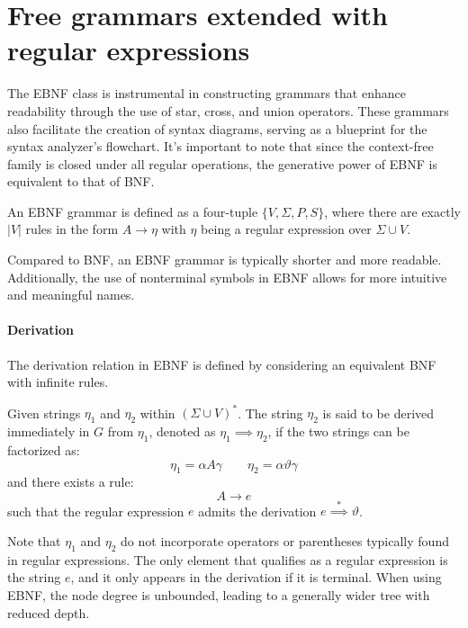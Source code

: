 \section{Free grammars extended with regular expressions}


The EBNF class is instrumental in constructing grammars that enhance readability through the use of star, cross, and union operators. 
These grammars also facilitate the creation of syntax diagrams, serving as a blueprint for the syntax analyzer's flowchart.
It's important to note that since the context-free family is closed under all regular operations, the generative power of EBNF is equivalent to that of BNF.
\begin{definition}
    An EBNF grammar is defined as a four-tuple $\{V, \Sigma, P, S\}$, where there are exactly $\left\lvert V \right\rvert$ rules in the form $A \rightarrow \eta$ with $\eta$ being a regular expression over $\Sigma \cup V$.
\end{definition}
Compared to BNF, an EBNF grammar is typically shorter and more readable. 
Additionally, the use of nonterminal symbols in EBNF allows for more intuitive and meaningful names.

\paragraph*{Derivation}
The derivation relation in EBNF is defined by considering an equivalent BNF with infinite rules. 
\begin{definition}
    Given strings $\eta_1$ and $\eta_2$ within $(\Sigma \cup V)^{\ast}$. 
    The string $\eta_2$ is said to be derived immediately in $G$ from $\eta_1$, denoted as $\eta_1 \implies \eta_2$, if the two strings can be factorized as: 
    \[\eta_1=\alpha A \gamma\qquad\eta_2=\alpha \vartheta \gamma\]
    and there exists a rule: 
    \[A \rightarrow e\]
    such that the regular expression $e$ admits the derivation $e \overset{\ast}{\implies} \vartheta$. 
\end{definition}
Note that $\eta_1$ and $\eta_2$ do not incorporate operators or parentheses typically found in regular expressions.
The only element that qualifies as a regular expression is the string $e$, and it only appears in the derivation if it is terminal.
When using EBNF, the node degree is unbounded, leading to a generally wider tree with reduced depth.